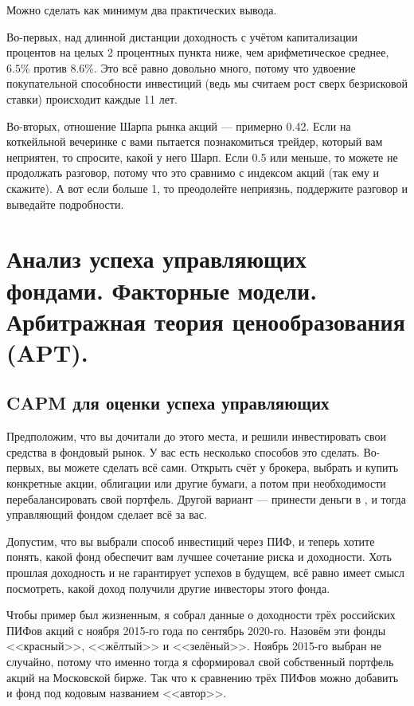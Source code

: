 Можно сделать как минимум два практических вывода.

Во-первых, над длинной дистанции доходность с учётом капитализации процентов
на целых 2 процентных пункта ниже, чем арифметическое среднее, $6.5\%$ против $8.6\%$. Это всё равно довольно много, потому что удвоение покупательной способности инвестиций (ведь мы считаем рост сверх безрисковой ставки) происходит каждые 11 лет.

Во-вторых, отношение Шарпа рынка акций --- примерно 0.42. Если на коткейльной
вечеринке с вами пытается познакомиться трейдер, который вам неприятен, то спросите, какой у него Шарп. Если 0.5 или меньше, то можете не продолжать разговор, потому что это сравнимо с индексом акций (так ему и скажите). А вот если больше 1, то преодолейте неприязнь, поддержите разговор и выведайте подробности.


\section{Анализ успеха управляющих фондами. Факторные модели. Арбитражная 
теория ценообразования (APT).}

\subsection{CAPM для оценки успеха управляющих}

Предположим, что вы дочитали до этого места, и решили инвестировать свои средства в фондовый рынок. У вас есть несколько способов это сделать. Во-первых, вы можете сделать всё сами. Открыть счёт у брокера, выбрать и купить конкретные акции, облигации или другие бумаги, а потом при необходимости перебалансировать свой портфель. Другой вариант --- принести деньги в , и тогда управляющий фондом сделает всё за вас.

Допустим, что вы выбрали способ инвестиций через ПИФ, и теперь хотите понять, какой фонд обеспечит вам лучшее сочетание риска и доходности. Хоть прошлая доходность и не гарантирует успехов в будущем, всё равно имеет смысл посмотреть, какой доход получили другие инвесторы этого фонда.

Чтобы пример был жизненным, я собрал данные о доходности трёх российских ПИФов акций с ноября 2015-го года по сентябрь 2020-го. Назовём эти фонды <<красный>>, <<жёлтый>> и <<зелёный>>. Ноябрь 2015-го выбран не случайно, потому что именно тогда я сформировал свой собственный портфель акций на Московской бирже. Так что к сравнению трёх ПИФов можно добавить и фонд под кодовым названием <<автор>>.

